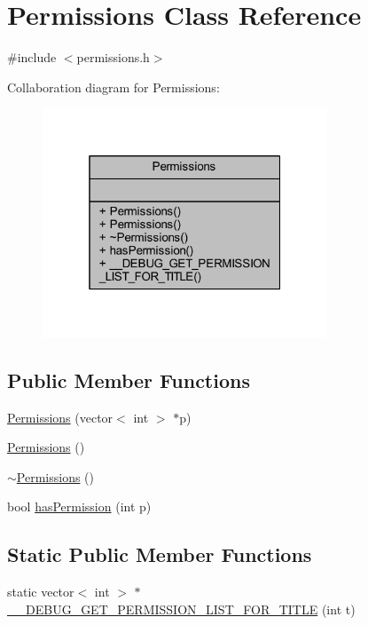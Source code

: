 \hypertarget{class_permissions}{}\section{Permissions Class Reference}
\label{class_permissions}


{\ttfamily \#include $<$permissions.\+h$>$}



Collaboration diagram for Permissions\+:
\nopagebreak
\begin{figure}[H]
\begin{center}
\leavevmode
\includegraphics[width=241pt]{class_permissions__coll__graph}
\end{center}
\end{figure}
\subsection*{Public Member Functions}
\begin{DoxyCompactItemize}
\item 
\hyperlink{class_permissions_aa700ebb7c25d7126a91e2149c89b4d4a}{Permissions} (vector$<$ int $>$ $\ast$p)
\item 
\hyperlink{class_permissions_a1f9131a44fe33ba571f12f59bff33a0a}{Permissions} ()
\item 
\hyperlink{class_permissions_a97b860cc5642d67981191b53dc6ea589}{$\sim$\+Permissions} ()
\item 
bool \hyperlink{class_permissions_abc7048444dc2fef9981751cdead6a939}{has\+Permission} (int p)
\end{DoxyCompactItemize}
\subsection*{Static Public Member Functions}
\begin{DoxyCompactItemize}
\item 
static vector$<$ int $>$ $\ast$ \hyperlink{class_permissions_ae0e4bb7cbd4b968c55a3c8b8e6fad1bd}{\+\_\+\+\_\+\+D\+E\+B\+U\+G\+\_\+\+G\+E\+T\+\_\+\+P\+E\+R\+M\+I\+S\+S\+I\+O\+N\+\_\+\+L\+I\+S\+T\+\_\+\+F\+O\+R\+\_\+\+T\+I\+T\+L\+E} (int t)
\end{DoxyCompactItemize}


